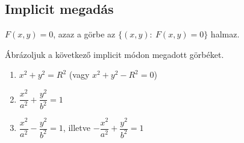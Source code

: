 \documentclass[11pt]{article}
\begin{document}
\subsection{Implicit megadás}

\begin{defbox}
\begin{definition}
$F(x, y)=0$, azaz a görbe az $\bigl\{(x, y):\ F(x, y)=0\bigr\}$ halmaz.
\end{definition}
\end{defbox}

\begin{exbox}
\begin{example}
Ábrázoljuk a következő implicit módon megadott görbéket.
\begin{enumerate}[label=\arabic*., itemsep=6pt]
\item $x^{2}+y^{2}=R^{2}$ (vagy $x^{2}+y^{2}-R^{2}=0$)
\item $\dfrac{x^{2}}{a^{2}}+\dfrac{y^{2}}{b^{2}}=1$
\item $\dfrac{x^{2}}{a^{2}}-\dfrac{y^{2}}{b^{2}}=1$, illetve $-\dfrac{x^{2}}{a^{2}}+\dfrac{y^{2}}{b^{2}}=1$
\end{enumerate}
\end{example}
\end{exbox}
\end{document}
